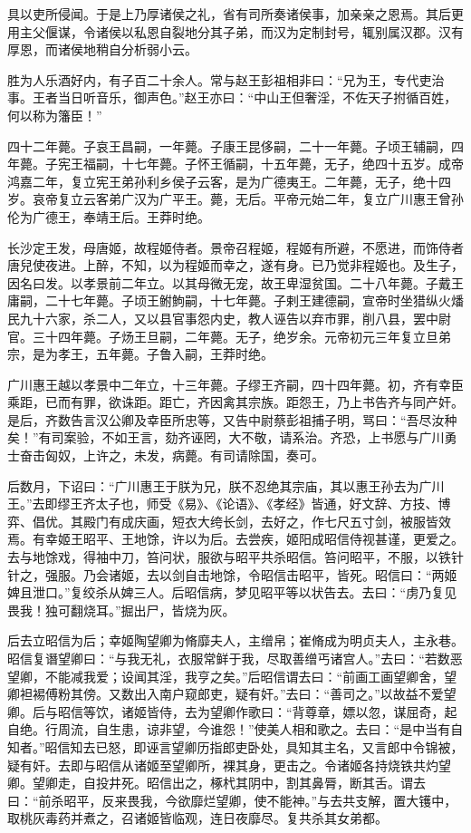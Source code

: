 \documentclass[12pt,UTF8]{ctexbook}
\begin{document}
具以吏所侵闻。于是上乃厚诸侯之礼，省有司所奏诸侯事，加亲亲之恩焉。其后更用主父偃谋，令诸侯以私恩自裂地分其子弟，而汉为定制封号，辄别属汉郡。汉有厚恩，而诸侯地稍自分析弱小云。



胜为人乐酒好内，有子百二十余人。常与赵王彭祖相非曰：“兄为王，专代吏治事。王者当日听音乐，御声色。”赵王亦曰：“中山王但奢淫，不佐天子拊循百姓，何以称为籓臣！”



四十二年薨。子哀王昌嗣，一年薨。子康王昆侈嗣，二十一年薨。子顷王辅嗣，四年薨。子宪王福嗣，十七年薨。子怀王循嗣，十五年薨，无子，绝四十五岁。成帝鸿嘉二年，复立宪王弟孙利乡侯子云客，是为广德夷王。二年薨，无子，绝十四岁。哀帝复立云客弟广汉为广平王。薨，无后。平帝元始二年，复立广川惠王曾孙伦为广德王，奉靖王后。王莽时绝。



长沙定王发，母唐姬，故程姬侍者。景帝召程姬，程姬有所避，不愿进，而饰侍者唐兒使夜进。上醉，不知，以为程姬而幸之，遂有身。已乃觉非程姬也。及生子，因名曰发。以孝景前二年立。以其母微无宠，故王卑湿贫国。二十八年薨。子戴王庸嗣，二十七年薨。子顷王鲋鮈嗣，十七年薨。子剌王建德嗣，宣帝时坐猎纵火燔民九十六家，杀二人，又以县官事怨内史，教人诬告以弃市罪，削八县，罢中尉官。三十四年薨。子炀王旦嗣，二年薨。无子，绝岁余。元帝初元三年复立旦弟宗，是为孝王，五年薨。子鲁入嗣，王莽时绝。



广川惠王越以孝景中二年立，十三年薨。子缪王齐嗣，四十四年薨。初，齐有幸臣乘距，已而有罪，欲诛距。距亡，齐因禽其宗族。距怨王，乃上书告齐与同产奸。是后，齐数告言汉公卿及幸臣所忠等，又告中尉蔡彭祖捕子明，骂曰：“吾尽汝种矣！”有司案验，不如王言，劾齐诬罔，大不敬，请系治。齐恐，上书愿与广川勇士奋击匈奴，上许之，未发，病薨。有司请除国，奏可。



后数月，下诏曰：“广川惠王于朕为兄，朕不忍绝其宗庙，其以惠王孙去为广川王。”去即缪王齐太子也，师受《易》、《论语》、《孝经》皆通，好文辞、方技、博弈、倡优。其殿门有成庆画，短衣大绔长剑，去好之，作七尺五寸剑，被服皆效焉。有幸姬王昭平、王地馀，许以为后。去尝疾，姬阳成昭信侍视甚谨，更爱之。去与地馀戏，得袖中刀，笞问状，服欲与昭平共杀昭信。笞问昭平，不服，以铁针针之，强服。乃会诸姬，去以剑自击地馀，令昭信击昭平，皆死。昭信曰：“两姬婢且泄口。”复绞杀从婢三人。后昭信病，梦见昭平等以状告去。去曰：“虏乃复见畏我！独可翻烧耳。”掘出尸，皆烧为灰。



后去立昭信为后；幸姬陶望卿为脩靡夫人，主缯帛；崔脩成为明贞夫人，主永巷。昭信复谮望卿曰：“与我无礼，衣服常鲜于我，尽取善缯丐诸宫人。”去曰：“若数恶望卿，不能减我爱；设闻其淫，我亨之矣。”后昭信谓去曰：“前画工画望卿舍，望卿袒裼傅粉其傍。又数出入南户窥郎吏，疑有奸。”去曰：“善司之。”以故益不爱望卿。后与昭信等饮，诸姬皆侍，去为望卿作歌曰：“背尊章，嫖以忽，谋屈奇，起自绝。行周流，自生患，谅非望，今谁怨！”使美人相和歌之。去曰：“是中当有自知者。”昭信知去已怒，即诬言望卿历指郎吏卧处，具知其主名，又言郎中令锦被，疑有奸。去即与昭信从诸姬至望卿所，裸其身，更击之。令诸姬各持烧铁共灼望卿。望卿走，自投井死。昭信出之，椓杙其阴中，割其鼻脣，断其舌。谓去曰：“前杀昭平，反来畏我，今欲靡烂望卿，使不能神。”与去共支解，置大镬中，取桃灰毒药并煮之，召诸姬皆临观，连日夜靡尽。复共杀其女弟都。
\end{document}
